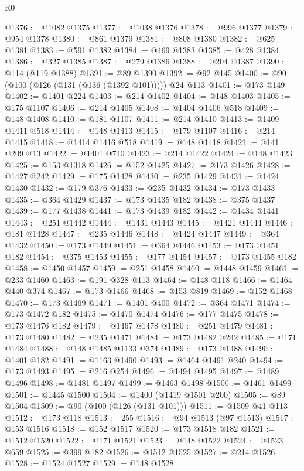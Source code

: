 \begin{lexlean}{R0}
\begin{coremodule}
@1376 := @1082 @1375
@1377 := @1038 @1376
@1378 := @996 @1377
@1379 := @954 @1378
@1380 := @861 @1379
@1381 := @808 @1380
@1382 := @625 @1381
@1383 := @591 @1382
@1384 := @469 @1383
@1385 := @428 @1384
@1386 := @327 @1385
@1387 := @279 @1386
@1388 := @204 @1387
@1390 := @114 (@119 @1388)
@1391 := @89 @1390
@1392 := @92 @145
@1400 := @90 (@100 (@126 (@131 (@136 (@1392 @101))))) @24 @113
@1401 := @173 @149
@1402 := @1401 @224
@1403 := @214 @1402
@1404 := @148 @1403
@1405 := @175 @1107
@1406 := @214 @1405
@1408 := @1404 @1406 @518
@1409 := @148 @1408
@1410 := @181 @1107
@1411 := @214 @1410
@1413 := @1409 @1411 @518
@1414 := @148 @1413
@1415 := @179 @1107
@1416 := @214 @1415
@1418 := @1414 @1416 @518
@1419 := @148 @1418
@1421 := @141 @209 @13
@1422 := @1401 @740
@1423 := @214 @1422
@1424 := @148 @1423
@1425 := @153 @1318
@1426 := @152 @1425
@1427 := @173 @1426
@1428 := @1427 @242
@1429 := @175 @1428
@1430 := @235 @1429
@1431 := @1424 @1430
@1432 := @179 @376
@1433 := @235 @1432
@1434 := @173 @1433
@1435 := @364 @1429
@1437 := @173 @1435 @182
@1438 := @375 @1437
@1439 := @177 @1438
@1441 := @173 @1439 @182
@1442 := @1434 @1441
@1443 := @251 @1442
@1444 := @1431 @1443
@1445 := @1421 @1444
@1446 := @181 @1428
@1447 := @235 @1446
@1448 := @1424 @1447
@1449 := @364 @1432
@1450 := @173 @1449
@1451 := @364 @1446
@1453 := @173 @1451 @182
@1454 := @375 @1453
@1455 := @177 @1454
@1457 := @173 @1455 @182
@1458 := @1450 @1457
@1459 := @251 @1458
@1460 := @1448 @1459
@1461 := @233 @1460
@1463 := @191 @328 @113
@1464 := @148 @118
@1466 := @1464 @440 @374
@1467 := @173 @1466
@1468 := @153 @819
@1469 := @152 @1468
@1470 := @173 @1469
@1471 := @1401 @400
@1472 := @364 @1471
@1474 := @173 @1472 @182
@1475 := @1470 @1474
@1476 := @177 @1475
@1478 := @173 @1476 @182
@1479 := @1467 @1478
@1480 := @251 @1479
@1481 := @173 @1480
@1482 := @235 @1471
@1484 := @173 @1482 @242
@1485 := @171 @1484
@1488 := @148 @1485 @1133 @374
@1489 := @173 @1488
@1490 := @1401 @182
@1491 := @1163 @1490
@1493 := @1464 @1491 @240
@1494 := @173 @1493
@1495 := @216 @254
@1496 := @1494 @1495
@1497 := @1489 @1496
@1498 := @1481 @1497
@1499 := @1463 @1498
@1500 := @1461 @1499
@1501 := @1445 @1500
@1504 := @1400 (@1419 @1501 @200)
@1505 := @89 @1504
@1509 := @90 (@100 (@126 (@131 @101)))
@1511 := @1509 @41 @113
@1512 := @173 @118
@1513 := 255
@1516 := @94 @1513 (@97 @1513)
@1517 := @153 @1516
@1518 := @152 @1517
@1520 := @173 @1518 @182
@1521 := @1512 @1520
@1522 := @171 @1521
@1523 := @148 @1522
@1524 := @1523 @659
@1525 := @399 @182
@1526 := @1512 @1525
@1527 := @214 @1526
@1528 := @1524 @1527
@1529 := @148 @1528

\end{coremodule}
\end{lexlean}
